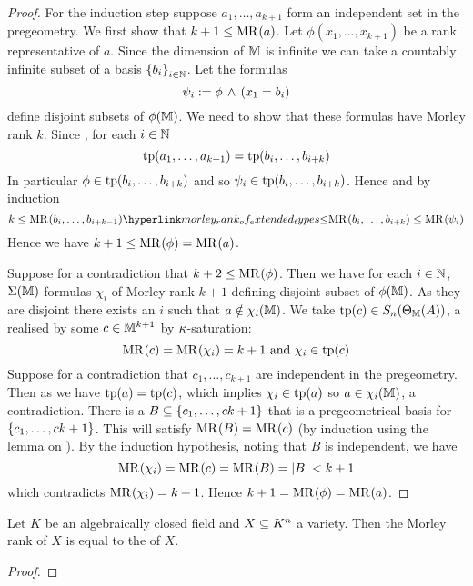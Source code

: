 \begin{proof}
    For the induction step suppose 
    $a_1,\dots,a_{k+1}$ form an independent set in the 
    pregeometry.
    We first show that $k + 1 \leq \mathrm{MR}^{}(a)$.
    Let $\phi(x_1,\dots,x_{k+1})$ be a rank representative of $a$.
    Since the dimension of $\mathbb{M}$ is infinite we can take a countably infinite 
    subset of a basis $\left\{b_i\right\}_{i \in \mathbb{N}}$. 
    Let the formulas 
    \[
        \psi_i := \phi \, \land \, (x_1 = b_i)
    \]
    define disjoint subsets of $\phi(\mathbb{M})$.
    We need to show that these formulas have Morley rank $k$.
    Since , for each $i \in \mathbb{N}$ 
    \[\operatorname{tp}(a_1,\dots,a_{k+1}) = \operatorname{tp}(b_i,\dots,b_{i+k})\]
    In particular $\phi \in \operatorname{tp}(b_i,\dots,b_{i+k})$ and so 
    $\psi_i \in \operatorname{tp}(b_i,\dots,b_{i+k})$.
    Hence and by induction 
    \[
        k \leq \MR{}{b_i,\dots,b_{i+k-1}} 
        \linkto{morley_rank_of_extended_types}{\leq} \MR{}{b_i,\dots,b_{i+k}}
        \leq \MR{}{\psi_i}
    \]
    Hence we have $k + 1 \leq \mathrm{MR}^{}(\phi) = \mathrm{MR}^{}(a)$.

    Suppose for a contradiction that $k + 2 \leq \mathrm{MR}^{}(\phi)$.
    Then we have for each $i \in \mathbb{N}$, $\Sigma(\mathbb{M})$-formulas $\chi_i$
    of Morley rank $k + 1$ defining disjoint subset of $\phi(\mathbb{M})$.
    As they are disjoint there exists an $i$ such that $a \notin \chi_i(\mathbb{M})$.
    We take $\operatorname{tp}(c) \in S_n(\Theta_{\mathbb{M}}(A))$, 
    a 
    realised by some $c \in \mathbb{M}^{k+1}$ by $\kappa$-saturation:
    \[\mathrm{MR}^{}(c) = \mathrm{MR}^{}(\chi_i) = k + 1 \text{ and } \chi_i \in \operatorname{tp}(c)\]
    Suppose for a contradiction that $c_1,\dots,c_{k+1}$ are independent in the 
    pregeometry.
    Then as  we have $\operatorname{tp}(a) = \operatorname{tp}(c)$,
    which implies $\chi_i \in \operatorname{tp}(a)$ so $a \in \chi_i(\mathbb{M})$, a contradiction.
    There is a 
    $B \subseteq \left\{c_1,\dots,c{k+1}\right\}$ 
    that is a pregeometrical basis for $\left\{c_1,\dots,c{k+1}\right\}$.
    This will satisfy $\mathrm{MR}^{}(B) = \mathrm{MR}^{}(c)$ (by induction using the lemma on 
    ).
    By the induction hypothesis, noting that $B$ is independent, we have
    \[\mathrm{MR}^{}(\chi_i) = \mathrm{MR}^{}(c) = \mathrm{MR}^{}(B) = \left\vert B \right\vert < k + 1\]
    which contradicts $\mathrm{MR}^{}(\chi_i) = k + 1$.
    Hence $k + 1 = \mathrm{MR}^{}(\phi) = \mathrm{MR}^{}(a)$.
\end{proof}

\begin{prop}
    Let $K$ be an algebraically closed field and $X \subseteq K^n$ a variety.
    Then the Morley rank of $X$ is equal to the 
     of $X$.
\end{prop}
\begin{proof}
    
\end{proof}